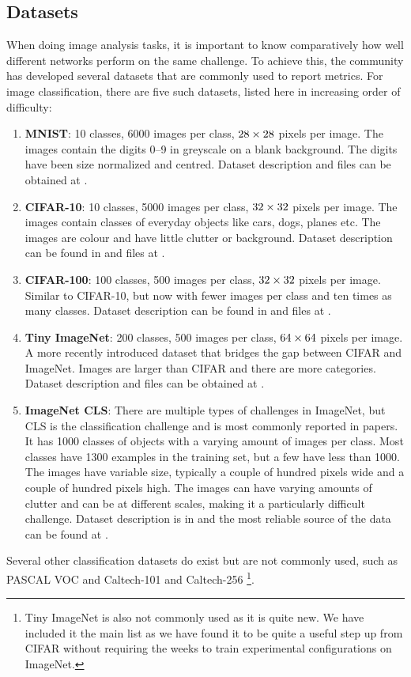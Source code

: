 \subsection{Datasets}
When doing image analysis tasks, it is important to know comparatively how well
different networks perform on the same challenge. To achieve this, the
community has developed several datasets that are commonly used to report
metrics. For image classification, there are five such datasets, listed here in
increasing order of difficulty:
\begin{enumerate}
  \item \textbf{MNIST}: 10 classes, 6000 images per class, $28\times 28$ pixels per image. 
    The images contain the digits 0--9 in greyscale on a blank background. The
    digits have been size normalized and centred. Dataset description and files can be obtained 
    at \cite{lecun_modified_1998}.
  \item \textbf{CIFAR-10}: 10 classes, 5000 images per class, $32\times 32$ pixels per image.
    The images contain classes of everyday objects like cars, dogs, planes etc.
    The images are colour and have little clutter or background. Dataset
    description can be found in \cite{krizhevsky_learning_2009} and files at
    \cite{krizhevsky_cifar_2009}.
  \item \textbf{CIFAR-100}: 100 classes, 500 images per class, $32\times 32$ pixels per image. 
    Similar to CIFAR-10, but now with fewer images per class and ten times as
    many classes. Dataset description can be found in
    \cite{krizhevsky_learning_2009} and files at \cite{krizhevsky_cifar_2009}.
  \item \textbf{Tiny ImageNet}: 200 classes, 500 images per class, 
    $64 \times 64$ pixels per image. A more recently introduced dataset that bridges
    the gap between CIFAR and ImageNet. Images are larger than CIFAR and there
    are more categories. Dataset description and files can be obtained at \cite{li_tiny_2017}.
  \item \textbf{ImageNet CLS}: There are multiple types of challenges in ImageNet, but CLS
    is the classification challenge and is most commonly reported in papers. 
    It has 1000 classes of objects with a varying amount of images per class.
    Most classes have 1300 examples in the training set, but a few have less
    than 1000. The images have variable size, typically a couple of hundred
    pixels wide and a couple of hundred pixels high. The images can have varying
    amounts of clutter and can be at different scales, making it a particularly
    difficult challenge. Dataset description is in
    \cite{russakovsky_imagenet_2014} and the most reliable source of the data
    can be found at \cite{stanford_vision_lab_imagenet_2017}.
\end{enumerate}
Several other classification datasets do exist but are not commonly used, such
as PASCAL VOC \cite{Everingham15} and Caltech-101 and Caltech-256
\cite{li_fei-fei_learning_2004}\footnote{Tiny ImageNet is also not commonly 
used as it is quite new. We have included it the main list as we have found it 
to be quite a useful step up from CIFAR without requiring the weeks to train
experimental configurations on ImageNet.}.

